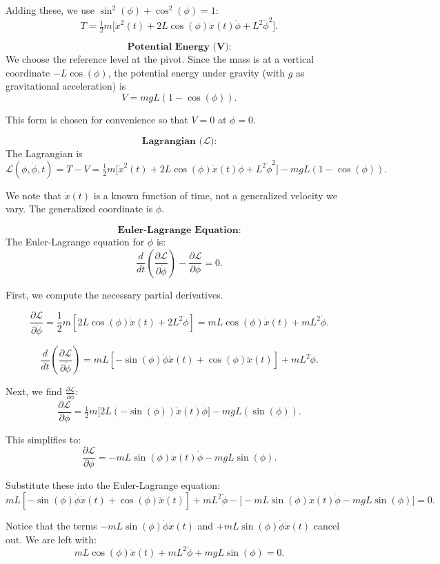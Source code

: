 \documentclass{article}
\begin{document}
Adding these, we use \(\sin^2(\phi)+\cos^2(\phi)=1\):
\[
T = \tfrac{1}{2}m\bigl[\dot{x}^2(t) + 2L\cos(\phi)\dot{x}(t)\dot{\phi} + L^2\dot{\phi}^2\bigr].
\]

\[
\textbf{Potential Energy (V):}
\]
We choose the reference level at the pivot. Since the mass is at a vertical coordinate \(-L\cos(\phi)\), the potential energy under gravity (with \(g\) as gravitational acceleration) is
\[
V = mgL(1-\cos(\phi)).
\]

This form is chosen for convenience so that \(V=0\) at \(\phi=0\).

\[
\textbf{Lagrangian (}\mathcal{L}\textbf{):}
\]
The Lagrangian is
\[
\mathcal{L}(\phi,\dot{\phi},t) = T - V = \tfrac{1}{2}m\bigl[\dot{x}^2(t) + 2L\cos(\phi)\dot{x}(t)\dot{\phi} + L^2\dot{\phi}^2\bigr] - mgL(1-\cos(\phi)).
\]

We note that \(\dot{x}(t)\) is a known function of time, not a generalized velocity we vary. The generalized coordinate is \(\phi\).

\[
\textbf{Euler-Lagrange Equation:}
\]
The Euler-Lagrange equation for \(\phi\) is:
\[
\frac{d}{dt}\left(\frac{\partial \mathcal{L}}{\partial \dot{\phi}}\right) - \frac{\partial \mathcal{L}}{\partial \phi} = 0.
\]

First, we compute the necessary partial derivatives.

\[
\frac{\partial \mathcal{L}}{\partial \dot{\phi}} = \frac{1}{2}m\left[2L\cos(\phi)\dot{x}(t) + 2L^2\dot{\phi}\right] = mL\cos(\phi)\dot{x}(t) + mL^2\dot{\phi}.
\]

\[
\frac{d}{dt}\left(\frac{\partial \mathcal{L}}{\partial \dot{\phi}}\right) = mL\left[-\sin(\phi)\dot{\phi}\dot{x}(t) + \cos(\phi)\ddot{x}(t)\right] + mL^2\ddot{\phi}.
\]

Next, we find \(\frac{\partial \mathcal{L}}{\partial \phi}\):
\[
\frac{\partial \mathcal{L}}{\partial \phi} = \tfrac{1}{2}m\bigl[2L(-\sin(\phi))\dot{x}(t)\dot{\phi}\bigr] - mgL(\sin(\phi)).
\]

This simplifies to:
\[
\frac{\partial \mathcal{L}}{\partial \phi} = -mL\sin(\phi)\dot{x}(t)\dot{\phi} - mgL\sin(\phi).
\]

Substitute these into the Euler-Lagrange equation:
\[
mL[-\sin(\phi)\dot{\phi}\dot{x}(t) + \cos(\phi)\ddot{x}(t)] + mL^2\ddot{\phi} - \bigl[-mL\sin(\phi)\dot{x}(t)\dot{\phi} - mgL\sin(\phi)\bigr] = 0.
\]

Notice that the terms \(-mL\sin(\phi)\dot{\phi}\dot{x}(t)\) and \(+mL\sin(\phi)\dot{\phi}\dot{x}(t)\) cancel out. We are left with:
\[
mL\cos(\phi)\ddot{x}(t) + mL^2\ddot{\phi} + mgL\sin(\phi) = 0.
\]
\end{document}
